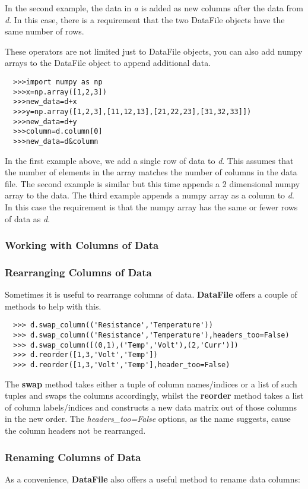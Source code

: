 \documentclass[a4paper,11pt]{scrartcl}
\begin{document}
In the second example, the data in \textit{a} is added as new columns after the
data from \textit{d}. In this case, there is a requirement that the two DataFile
objects have the same number of rows.

These operators are not limited just to DataFile objects, you can also add numpy
arrays to the DataFile object to append additional data.
\begin{verbatim}
  >>>import numpy as np
  >>>x=np.array([1,2,3])
  >>>new_data=d+x
  >>>y=np.array([1,2,3],[11,12,13],[21,22,23],[31,32,33]])
  >>>new_data=d+y
  >>>column=d.column[0]
  >>>new_data=d&column
\end{verbatim}
In the first example above, we add a single row of data to \textit{d}. This
assumes that the number of elements in the array matches the number of columns
in the data file. The second example is similar but this time appends a 2
dimensional numpy array to the data. The third example appends a numpy array as
a column to \textit{d}. In this case the requirement is that the numpy array has
the same or fewer rows of data as \textit{d}.

\subsubsection{Working with Columns of Data}
\subsubsection{Rearranging Columns of Data}
Sometimes it is useful to rearrange columns of data. \textbf{DataFile} offers a couple of methods to help with this.
\begin{verbatim}
  >>> d.swap_column(('Resistance','Temperature'))
  >>> d.swap_column(('Resistance','Temperature'),headers_too=False)
  >>> d.swap_column([(0,1),('Temp','Volt'),(2,'Curr')])
  >>> d.reorder([1,3,'Volt','Temp'])
  >>> d.reorder([1,3,'Volt','Temp'],header_too=False)
\end{verbatim}

The \textbf{swap} method takes either a tuple of column names/indices or a list of such tuples and swaps the columns accordingly, whilst the \textbf{reorder} method takes a list of column labels/indices and constructs a new data matrix out of those columns in the new order. The \textit{headers\_too=False} options, as the name suggests, cause the column headers not be rearranged.

\subsubsection{Renaming Columns of Data}
As a convenience, \textbf{DataFile} also offers a useful method to rename data columns:
\end{document}
